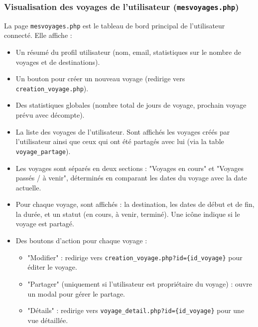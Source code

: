 \documentclass[a4paper,12pt]{article}
\begin{document}
\subsubsection{Visualisation des voyages de l'utilisateur (\texttt{mesvoyages.php})}
La page \texttt{mesvoyages.php} est le tableau de bord principal de l'utilisateur connecté. Elle affiche :
\begin{itemize}
  \item Un résumé du profil utilisateur (nom, email, statistiques sur le nombre de voyages et de destinations).
  \item Un bouton pour créer un nouveau voyage (redirige vers \texttt{creation\_voyage.php}).
  \item Des statistiques globales (nombre total de jours de voyage, prochain voyage prévu avec décompte).
  \item La liste des voyages de l'utilisateur. Sont affichés les voyages créés par l'utilisateur ainsi que ceux qui ont été partagés avec lui (via la table \texttt{voyage\_partage}).
  \item Les voyages sont séparés en deux sections : "Voyages en cours" et "Voyages passés / à venir", déterminés en comparant les dates du voyage avec la date actuelle.
  \item Pour chaque voyage, sont affichés : la destination, les dates de début et de fin, la durée, et un statut (en cours, à venir, terminé). Une icône indique si le voyage est partagé.
  \item Des boutons d'action pour chaque voyage :
    \begin{itemize}
        \item "Modifier" : redirige vers \texttt{creation\_voyage.php?id=\{id\_voyage\}} pour éditer le voyage.
        \item "Partager" (uniquement si l'utilisateur est propriétaire du voyage) : ouvre un modal pour gérer le partage.
        \item "Détails" : redirige vers \texttt{voyage\_detail.php?id=\{id\_voyage\}} pour une vue détaillée.
    \end{itemize}
\end{itemize}
\end{document}
